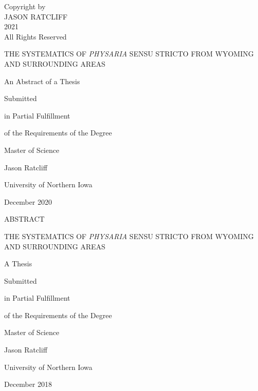\thispagestyle{empty}
\vspace*{\fill}         %
\begin{center}          
  Copyright by\\
  JASON RATCLIFF\\
  2021\\
  All Rights Reserved
\end{center}
\vspace*{\fill}
\clearpage

\clearpage
\thispagestyle{empty}
\begin{center} 
THE SYSTEMATICS OF \textit{PHYSARIA} SENSU STRICTO FROM WYOMING 
AND SURROUNDING AREAS
\end{center}
\vspace{120pt}
\begin{center}
  An Abstract of a Thesis

  Submitted

  in Partial Fulfillment

  of the Requirements of the Degree
  
  Master of Science
\end{center}
\vspace{120pt}
\begin{center}
  Jason Ratcliff
  
  University of Northern Iowa
  
  December 2020
\end{center}
\clearpage

\thispagestyle{empty}
\begin{center}
ABSTRACT
\end{center}
\clearpage

\clearpage
\thispagestyle{empty}
\begin{center} 
THE SYSTEMATICS OF \textit{PHYSARIA} SENSU STRICTO FROM WYOMING 
AND SURROUNDING AREAS
\end{center}
\vspace{120pt}
\begin{center}
  A Thesis

  Submitted

  in Partial Fulfillment

  of the Requirements of the Degree
  
  Master of Science
\end{center}
\vspace{120pt}
\begin{center}
  Jason Ratcliff
  
  University of Northern Iowa
  
  December 2018
\end{center}

